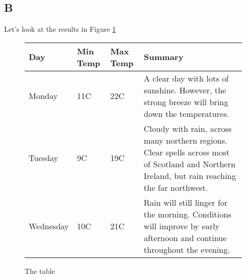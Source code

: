 \documentclass[11pt,a4paper]{article}
\begin{document}
\subsection{B}
Let's look at the results in Figure \ref{tab:first}
\begin{figure}[!h]
\centering
	\begin{tabular}{ | l | l | l | p{5cm} |}
		\hline
			Day & Min Temp & Max Temp & Summary \\ \hline
			Monday & 11C & 22C & A clear day with lots of sunshine.  
			However, the strong breeze will bring down the temperatures. \\ \hline
			Tuesday & 9C & 19C & Cloudy with rain, across many northern regions. Clear spells
			across most of Scotland and Northern Ireland,
			but rain reaching the far northwest. \\ \hline
			Wednesday & 10C & 21C & Rain will still linger for the morning.
			Conditions will improve by early afternoon and continue
			throughout the evening. \\
		\hline
	\end{tabular}
\caption{The table}
\label{tab:first}
\end{figure}
\end{document}
